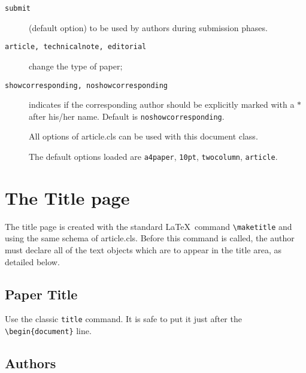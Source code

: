 \documentclass[10pt]{imeko_acta}
\def\file#1{\textsf{\fontsize{9.1}{9.5}\selectfont#1}\xspace}
\begin{document}
\begin{description}

\item [{\tt submit}]  (default option) to be used by authors during submission phases.


\item [{\tt article, technicalnote, editorial}]  change the type of paper;

\item [{\tt showcorresponding, noshowcorresponding}] indicates if the corresponding author should be explicitly marked with a $\ast$ after his/her name. Default is \verb|noshowcorresponding|.



\item[] All options of \file{article.cls} can be used with this
  document class.

\item[] The default options loaded are \verb+a4paper+, \verb+10pt+,
  \verb+twocolumn+, \verb+article+.

\end{description}

\section{The Title page}

The title page is created with the standard \LaTeX\ command \verb|\maketitle| and using the same schema of article.cls.
Before this command is called, the author must declare all of the text objects which are to appear in the title area, as detailed below.

\subsection{Paper Title} \label{sec:sub1}

Use the classic \verb|title| command. It is safe to put it just after the \verb|\begin{document}| line.

\subsection{Authors}
\end{document}
